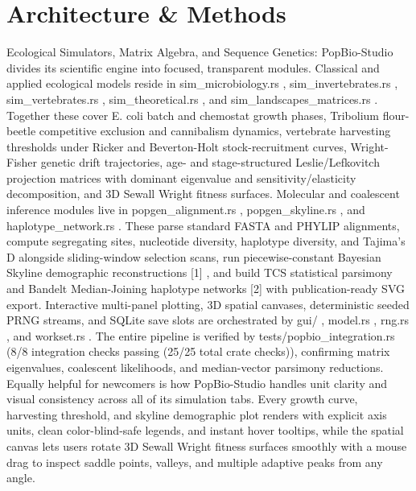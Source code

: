\documentclass[10pt,letterpaper]{article}
\begin{document}
\section{Architecture \& Methods}
Ecological Simulators, Matrix Algebra, and Sequence Genetics: PopBio-Studio divides its scientific engine into focused, transparent modules. Classical and applied ecological models reside in sim\_microbiology.rs , sim\_invertebrates.rs , sim\_vertebrates.rs , sim\_theoretical.rs , and sim\_landscapes\_matrices.rs . Together these cover E. coli batch and chemostat growth phases, Tribolium flour-beetle competitive exclusion and cannibalism dynamics, vertebrate harvesting thresholds under Ricker and Beverton-Holt stock-recruitment curves, Wright-Fisher genetic drift trajectories, age- and stage-structured Leslie/Lefkovitch projection matrices with dominant eigenvalue and sensitivity/elasticity decomposition, and 3D Sewall Wright fitness surfaces. Molecular and coalescent inference modules live in popgen\_alignment.rs , popgen\_skyline.rs , and haplotype\_network.rs . These parse standard FASTA and PHYLIP alignments, compute segregating sites, nucleotide diversity, haplotype diversity, and Tajima's D alongside sliding-window selection scans, run piecewise-constant Bayesian Skyline demographic reconstructions [1] , and build TCS statistical parsimony and Bandelt Median-Joining haplotype networks [2] with publication-ready SVG export. Interactive multi-panel plotting, 3D spatial canvases, deterministic seeded PRNG streams, and SQLite save slots are orchestrated by gui/ , model.rs , rng.rs , and workset.rs . The entire pipeline is verified by tests/popbio\_integration.rs (8/8 integration checks passing (25/25 total crate checks)), confirming matrix eigenvalues, coalescent likelihoods, and median-vector parsimony reductions. Equally helpful for newcomers is how PopBio-Studio handles unit clarity and visual consistency across all of its simulation tabs. Every growth curve, harvesting threshold, and skyline demographic plot renders with explicit axis units, clean color-blind-safe legends, and instant hover tooltips, while the spatial canvas lets users rotate 3D Sewall Wright fitness surfaces smoothly with a mouse drag to inspect saddle points, valleys, and multiple adaptive peaks from any angle.
\end{document}
